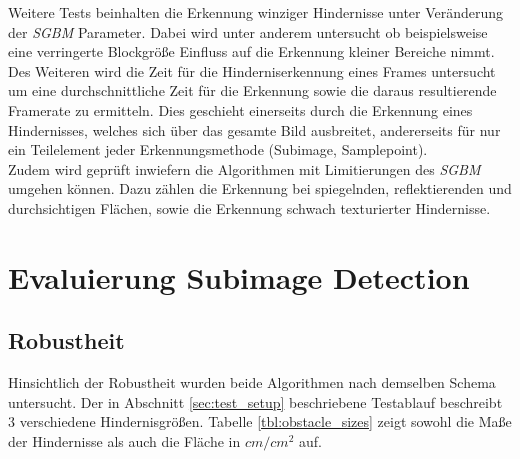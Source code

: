 \noindent
Weitere Tests beinhalten die Erkennung winziger Hindernisse unter Veränderung der \emph{SGBM} Parameter. Dabei wird unter anderem untersucht ob beispielsweise eine verringerte Blockgröße Einfluss auf die Erkennung kleiner Bereiche nimmt. Des Weiteren wird die Zeit für die Hinderniserkennung eines Frames untersucht um eine durchschnittliche Zeit für die Erkennung sowie die daraus resultierende Framerate zu ermitteln. Dies geschieht einerseits durch die Erkennung eines Hindernisses, welches sich über das gesamte Bild ausbreitet, andererseits für nur ein Teilelement jeder Erkennungsmethode (Subimage, Samplepoint).\\
Zudem wird geprüft inwiefern die Algorithmen mit Limitierungen des \emph{SGBM} umgehen können. Dazu zählen die Erkennung bei spiegelnden, reflektierenden und durchsichtigen Flächen, sowie die Erkennung schwach texturierter Hindernisse.\\



\section{Evaluierung Subimage Detection}
\label{sec:evaluierung_subimage}

    \subsection{Robustheit}
    \label{subsec:subimage_robustheit}
    Hinsichtlich der Robustheit wurden beide Algorithmen nach demselben Schema untersucht. Der in Abschnitt \ref{sec:test_setup} beschriebene Testablauf beschreibt 3 verschiedene Hindernisgrößen. Tabelle \ref{tbl:obstacle_sizes} zeigt sowohl die Maße der Hindernisse als auch die Fläche in $cm/cm^2$ auf.
    
